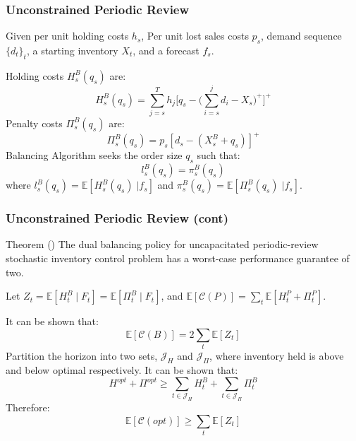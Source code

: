 \documentclass{beamer}
\newcommand{\EX}{\mathbb{E}}
\begin{document}
\begin{frame}[shrink=10]

\frametitle{Unconstrained Periodic Review}

Given per unit holding costs $h_s$, Per unit lost sales costs $p_s$, demand sequence $\{d_t\}_t$, a starting inventory $X_t$, and a forecast $f_s$.
\vspace{\baselineskip}


Holding costs $H^B_s(q_s)$ are: 
$$
	H_s^B(q_s) = \sum_{j=s}^T h_j \big[q_s - \big(\sum_{i=s}^j d_i - X_s\big)^+\big]^+
$$
Penalty costs $\Pi_s^B(q_s)$ are:
$$
	\Pi_s^B(q_s) =  p_s [d_s - (X_s^B + q_s)]^+ 
$$
Balancing Algorithm seeks the order size $q_s$ such that:
$$
	l_s^B(q_s) = \pi_s^B(q_s)
$$
where $l_s^B(q_s) = \EX[H_s^B(q_s) \; | f_s]$ and $\pi_s^B(q_s) = \EX[\Pi_s^B(q_s) \; | f_s]$.
\end{frame}




\begin{frame}
\frametitle{Unconstrained Periodic Review (cont)}
\begin{block}{Theorem (\cite{levi:2007})}
The dual balancing policy for uncapacitated periodic-review stochastic inventory control problem has a worst-case performance guarantee of two. 
\end{block}
Let $Z_t = \EX[H_t^B \; | \; F_t] = \EX[\Pi_t^B \; | \; F_t]$, and $\EX[\mathcal{C}(P)] = \sum_t \EX[H_t^P + \Pi_t^P]$. 
\vspace{\baselineskip}

It can be shown that:
$$
	\EX[\mathcal{C}(B)] = 2 \sum_t \EX[Z_t]
$$ 
Partition the horizon into two sets, $\mathcal{J}_H$ and $\mathcal{J}_{\Pi}$, where inventory held is above and below optimal respectively. It can be shown that:
$$
	H^{opt} + \Pi^{opt} \geq \sum_{t \in \mathcal{J}_H} H_t^B + \sum_{t \in \mathcal{J}_{\Pi}} \Pi_t^B
$$
Therefore:
$$
	\EX[\mathcal{C}(opt)] \geq \sum_t \EX[Z_t]
$$
\end{frame}
\end{document}
